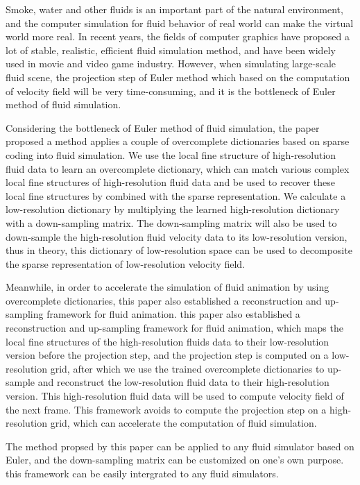 \begin{englishabstract}

Smoke, water and other fluids is an important part of the natural environment, and the computer simulation for fluid behavior of real world can make the virtual world more real. In recent years, the fields of computer graphics have proposed a lot of stable, realistic, efficient fluid simulation method, and have been widely used in movie and video game industry. However,  when simulating large-scale fluid scene, the projection step of Euler method which based on the computation of velocity field will be very time-consuming, and it is the bottleneck of Euler method of fluid simulation. 

Considering the bottleneck of Euler method of fluid simulation, the paper proposed a method applies a couple of overcomplete dictionaries based on sparse coding into fluid simulation. We use the local fine structure of high-resolution fluid data to learn an overcomplete dictionary, which can match various complex local fine structures of high-resolution fluid data and be used to recover these local fine structures by combined with the sparse representation. We calculate a low-resolution dictionary by multiplying the learned high-resolution dictionary with a down-sampling matrix. The down-sampling matrix will also be used to down-sample the high-resolution fluid velocity data to its low-resolution version, thus in theory, this dictionary of low-resolution space can be used to decomposite the sparse representation of low-resolution velocity field.

Meanwhile, in order to accelerate the simulation of fluid animation by using overcomplete dictionaries, this paper also established a reconstruction and up-sampling framework for fluid animation. this paper also established a reconstruction and up-sampling framework for fluid animation, which maps the local fine structures of the high-resolution fluids data to their low-resolution version before the projection step, 
and the projection step is computed on a low-resolution grid, after which we use the trained overcomplete dictionaries to up-sample and reconstruct the low-resolution fluid data to their high-resolution version. This high-resolution fluid data will be used to compute velocity field of the next frame.  This framework
avoids to compute the projection step on a high-resolution grid, which can accelerate the computation of fluid simulation.

The method propsed by this paper can be applied to any fluid simulator based on Euler, and the down-sampling matrix can be customized on one's own purpose. this framework can be easily intergrated to any fluid simulators.


\end{englishabstract}
